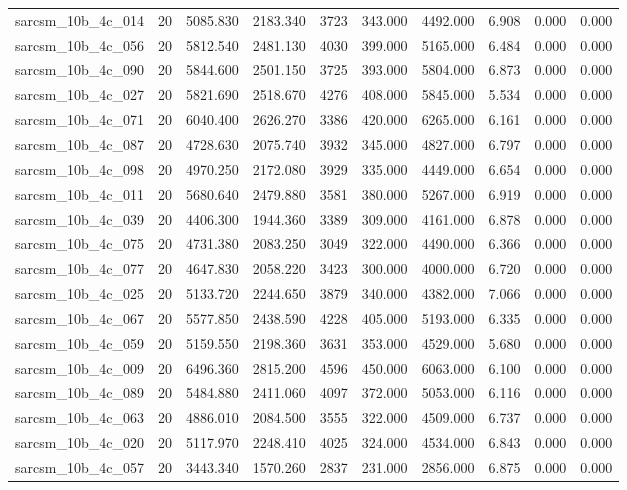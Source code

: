 \begin{tabular}{lrrrrrrrrr}
sarcsm\_10b\_4c\_014 & 20 & 5085.830 & 2183.340 & 3723 & 343.000 & 4492.000 & 6.908 & 0.000 & 0.000 \\
sarcsm\_10b\_4c\_056 & 20 & 5812.540 & 2481.130 & 4030 & 399.000 & 5165.000 & 6.484 & 0.000 & 0.000 \\
sarcsm\_10b\_4c\_090 & 20 & 5844.600 & 2501.150 & 3725 & 393.000 & 5804.000 & 6.873 & 0.000 & 0.000 \\
sarcsm\_10b\_4c\_027 & 20 & 5821.690 & 2518.670 & 4276 & 408.000 & 5845.000 & 5.534 & 0.000 & 0.000 \\
sarcsm\_10b\_4c\_071 & 20 & 6040.400 & 2626.270 & 3386 & 420.000 & 6265.000 & 6.161 & 0.000 & 0.000 \\
sarcsm\_10b\_4c\_087 & 20 & 4728.630 & 2075.740 & 3932 & 345.000 & 4827.000 & 6.797 & 0.000 & 0.000 \\
sarcsm\_10b\_4c\_098 & 20 & 4970.250 & 2172.080 & 3929 & 335.000 & 4449.000 & 6.654 & 0.000 & 0.000 \\
sarcsm\_10b\_4c\_011 & 20 & 5680.640 & 2479.880 & 3581 & 380.000 & 5267.000 & 6.919 & 0.000 & 0.000 \\
sarcsm\_10b\_4c\_039 & 20 & 4406.300 & 1944.360 & 3389 & 309.000 & 4161.000 & 6.878 & 0.000 & 0.000 \\
sarcsm\_10b\_4c\_075 & 20 & 4731.380 & 2083.250 & 3049 & 322.000 & 4490.000 & 6.366 & 0.000 & 0.000 \\
sarcsm\_10b\_4c\_077 & 20 & 4647.830 & 2058.220 & 3423 & 300.000 & 4000.000 & 6.720 & 0.000 & 0.000 \\
sarcsm\_10b\_4c\_025 & 20 & 5133.720 & 2244.650 & 3879 & 340.000 & 4382.000 & 7.066 & 0.000 & 0.000 \\
sarcsm\_10b\_4c\_067 & 20 & 5577.850 & 2438.590 & 4228 & 405.000 & 5193.000 & 6.335 & 0.000 & 0.000 \\
sarcsm\_10b\_4c\_059 & 20 & 5159.550 & 2198.360 & 3631 & 353.000 & 4529.000 & 5.680 & 0.000 & 0.000 \\
sarcsm\_10b\_4c\_009 & 20 & 6496.360 & 2815.200 & 4596 & 450.000 & 6063.000 & 6.100 & 0.000 & 0.000 \\
sarcsm\_10b\_4c\_089 & 20 & 5484.880 & 2411.060 & 4097 & 372.000 & 5053.000 & 6.116 & 0.000 & 0.000 \\
sarcsm\_10b\_4c\_063 & 20 & 4886.010 & 2084.500 & 3555 & 322.000 & 4509.000 & 6.737 & 0.000 & 0.000 \\
sarcsm\_10b\_4c\_020 & 20 & 5117.970 & 2248.410 & 4025 & 324.000 & 4534.000 & 6.843 & 0.000 & 0.000 \\
sarcsm\_10b\_4c\_057 & 20 & 3443.340 & 1570.260 & 2837 & 231.000 & 2856.000 & 6.875 & 0.000 & 0.000 \\

\end{tabular}

